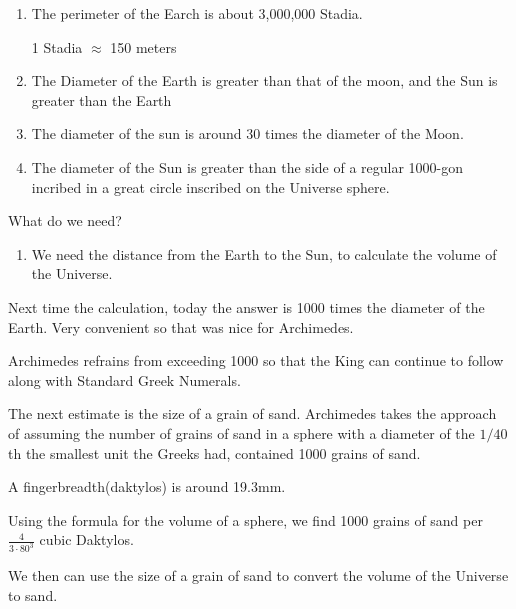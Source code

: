 \documentclass{report}
\begin{document}
\begin{description}
\begin{mdframed}
            \begin{enumerate}
                \item The perimeter of the Earch is about
                    3,000,000 Stadia.
                    \begin{mdframed}
                        1 Stadia $\approx$ 150 meters
                    \end{mdframed}
                \item The Diameter of the Earth is greater
                    than that of the moon, and the Sun is greater
                    than the Earth
                \item The diameter of the sun is around
                    30 times the diameter of the Moon.
                \item The diameter of the Sun is greater than the
                    side of a regular 1000-gon incribed in a
                    great circle inscribed on the Universe sphere.
            \end{enumerate}

            What do we need?
            \begin{enumerate}
                \item We need the distance from the Earth
                    to the Sun, to calculate the volume of the
                    Universe.
            \end{enumerate}

            Next time the calculation, today the answer is
            1000 times the diameter of the Earth. Very
            convenient so that was nice for Archimedes.

            Archimedes refrains from exceeding 1000 so that
            the King can continue to follow along with Standard
            Greek Numerals.
        \end{mdframed}
        \begin{mdframed}
            The next estimate is the size of a grain of sand.
            Archimedes takes the approach of assuming the number
            of grains of sand in a sphere with a diameter of
            the $1/40$th the smallest unit the Greeks had, contained 
            1000 grains of sand.

            A fingerbreadth(daktylos) is around 19.3mm.

            Using the formula for the volume of a sphere,
            we find 1000 grains of sand per $\frac{4}{3\cdot 80^3}$ cubic
            Daktylos.

            We then can use the size of a grain of sand to convert the volume
            of the Universe to sand.
        \end{mdframed}
\end{description}
\end{document}

